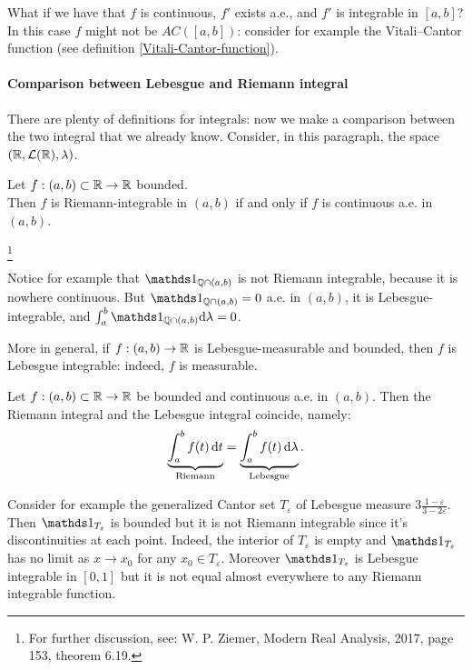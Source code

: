 What if we have that $f$ is continuous, $f'$ exists a.e., and $f'$ is integrable in $[a,b]$? In this case $f$ might not be $AC([a,b])$: consider for example the Vitali--Cantor function (see definition \vref{Vitali-Cantor-function}).

\paragraph{Comparison between Lebesgue and Riemann integral} There are plenty of definitions for integrals: now we make a comparison between the two integral that we already know. Consider, in this paragraph, the space $(\mathbb R, \mathcal L(\mathbb R), \lambda)$.
\begin{theo}
	Let $f:(a,b)\subset \mathbb R \to \mathbb R$ bounded. \\
	Then $f$ is Riemann-integrable in $(a,b)$ if and only if $f$ is continuous a.e. in $(a,b)$.
\end{theo}\footnote{For further discussion, see: W. P. Ziemer, Modern Real Analysis, 2017, page 153, theorem 6.19.}

Notice for example that $\Ind_{\QQ \cap (a,b)}$ is not Riemann integrable, because it is nowhere continuous. But $\Ind_{\QQ \cap (a,b)}=0$ a.e. in $(a,b)$, it is Lebesgue-integrable, and $\int_a^b \Ind_{\QQ \cap (a,b)} \dlam =0$.

More in general, if $f: (a,b) \to \mathbb R$ is Lebesgue-measurable and bounded, then $f$ is Lebesgue integrable: indeed, $f$ is measurable.

\begin{theo}
	Let $f:(a,b)\subset \mathbb R \to \mathbb R$ be bounded and continuous a.e. in $(a,b)$. Then the Riemann integral and the Lebesgue integral coincide,\footnotemark{} namely:
	$$ \underbrace{\int_a^b f(t) \,\mathrm d t}_{\text{Riemann}}
	= \underbrace{\int_a^b f(t) \,\mathrm d \lambda}_{\text{Lebesgue}}.$$
\end{theo}

Consider for example the generalized Cantor set $T_\varepsilon$ of Lebesgue measure $3\frac{1-\varepsilon}{3-2\varepsilon}$. Then $\Ind_{T_\varepsilon}$ is bounded but it is not Riemann integrable since it's discontinuities at each point. Indeed, the interior of $T_\varepsilon$ is empty and $\Ind_{T_\varepsilon}$ has no limit as $x\to x_0$ for any $x_0 \in T_\varepsilon$. Moreover $\Ind_{T_\varepsilon}$ is Lebesgue integrable in $[0,1]$ but it is not equal almost everywhere to any Riemann integrable function.


